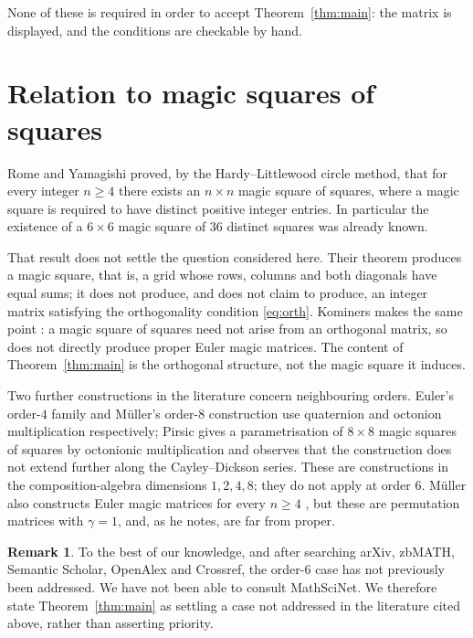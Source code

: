 \documentclass[11pt]{amsart}
\theoremstyle{plain}
\theoremstyle{definition}
\newtheorem{remark}[theorem]{Remark}
\begin{document}
None of these is required in order to accept Theorem~\ref{thm:main}: the matrix
is displayed, and the conditions are checkable by hand.

\section{Relation to magic squares of squares}

Rome and Yamagishi \cite[Theorem 1.2]{RomeYamagishi2025} proved, by the
Hardy--Littlewood circle method, that for every integer $n\geq 4$ there exists an
$n\times n$ magic square of squares, where a magic square is required to have
distinct positive integer entries. In particular the existence of a $6\times6$
magic square of $36$ distinct squares was already known.

That result does not settle the question considered here. Their theorem produces
a magic square, that is, a grid whose rows, columns and both diagonals have equal
sums; it does not produce, and does not claim to produce, an integer matrix
satisfying the orthogonality condition \eqref{eq:orth}. Kominers makes the same
point \cite{Kominers2026}: a magic square of squares need not arise from an
orthogonal matrix, so \cite{RomeYamagishi2025} does not directly produce proper
Euler magic matrices. The content of Theorem~\ref{thm:main} is the orthogonal
structure, not the magic square it induces.

Two further constructions in the literature concern neighbouring orders. Euler's
order-$4$ family and M\"uller's order-$8$ construction \cite{Muller2026} use
quaternion and octonion multiplication respectively; Pirsic
\cite{Pirsic2019,Pirsic2020} gives a parametrisation of $8\times8$ magic squares
of squares by octonionic multiplication and observes that the construction does
not extend further along the Cayley--Dickson series. These are constructions in
the composition-algebra dimensions $1,2,4,8$; they do not apply at order $6$.
M\"uller also constructs Euler magic matrices for every $n\geq4$
\cite[Theorem 4.1]{Muller2026}, but these are permutation matrices with
$\gamma=1$, and, as he notes, are far from proper.

\begin{remark}
To the best of our knowledge, and after searching arXiv, zbMATH, Semantic
Scholar, OpenAlex and Crossref, the order-$6$ case has not previously been
addressed. We have not been able to consult MathSciNet. We therefore state
Theorem~\ref{thm:main} as settling a case not addressed in the literature cited
above, rather than asserting priority.
\end{remark}
\end{document}

